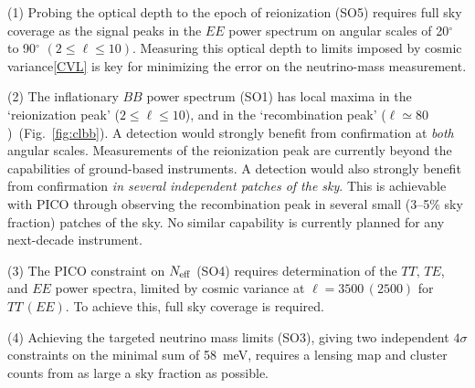 \documentclass[PICOReport.tex]{subfiles}
\begin{document}
(1) Probing the optical depth to the epoch of reionization (SO5) requires full sky coverage as the signal peaks in the $EE$ power spectrum on angular scales of 20$^\circ$ to 90$^\circ$ $(2 \leq \ell \leq 10)$. Measuring this optical depth to limits imposed by cosmic variance\cref{CVL} is key for minimizing the error on the neutrino-mass measurement. 

(2) The inflationary $BB$ power spectrum (SO1) has local maxima in the `reionization peak' ($ 2 \leq \ell \leq 10$), and in the `recombination peak' ($ \ell \simeq 80$)~(Fig.~\ref{fig:clbb}). A detection would strongly benefit from confirmation at {\it both} angular scales. Measurements of the reionization peak are currently beyond the capabilities of ground-based instruments. A detection would also strongly benefit from confirmation  {\it in several independent patches of the sky}. This is achievable with PICO through observing the recombination peak in several small (3--5\% sky fraction) patches of the sky. No similar capability is currently planned for any next-decade instrument.  

(3) The PICO constraint on $N_{\rm eff}$ (SO4) requires determination of the $TT,\, TE$, and $EE$ power spectra, limited by cosmic variance at $\ell=3500\,(2500)$ for $TT\,(EE)$. To achieve this, full sky coverage is required.  

(4) Achieving the targeted neutrino mass limits (SO3), giving two independent $4\sigma$ constraints on the minimal sum of 58~meV, requires a lensing map and cluster counts from as large a sky fraction as possible. 
\end{document}
